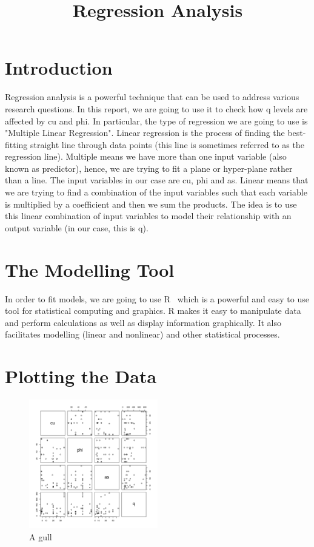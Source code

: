 \documentclass[a4paper,12pt, english]{article}
\begin{document}
\title{Regression Analysis}
\maketitle

\section{Introduction}
Regression analysis is a powerful technique that can be used to address various research questions. In this report, we are going to use it to check how q levels are affected by cu and phi. In particular, the type of regression we are going to use is "Multiple Linear Regression". Linear regression is the process of finding the best-fitting straight line through data points (this line is sometimes referred to as the regression line). Multiple means we have more than one input variable (also known as predictor), hence, we are trying to fit a plane or hyper-plane rather than a line.  The input variables in our case are cu, phi and as. Linear means that we are trying to find a combination of the input variables such that each variable is multiplied by a coefficient and then we sum the products. The idea is to use this linear combination of input variables to model their relationship with an output variable (in our case, this is q).

\section{The Modelling Tool}
In order to fit models, we are going to use R~\cite{R} which is a powerful and easy to use tool for statistical computing and graphics. R makes it easy to manipulate data and perform calculations as well as display information graphically. It also facilitates modelling (linear and nonlinear) and other statistical processes.
\section{Plotting the Data}
\begin{figure}[b]
  \centering
  \includegraphics[width=0.5\textwidth]{pairs}
  \caption{A gull}
  \label{fig:pairs}
\end{figure}
\end{document}
